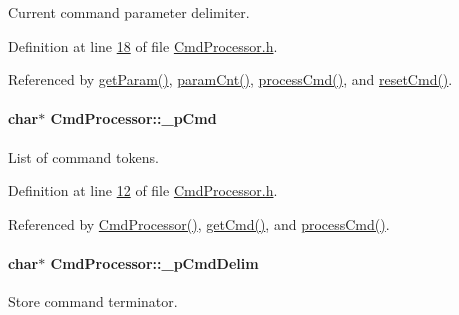 Current command parameter delimiter. 



Definition at line \hyperlink{_cmd_processor_8h_source_l00018}{18} of file \hyperlink{_cmd_processor_8h_source}{CmdProcessor.h}.



Referenced by \hyperlink{_cmd_processor_8cpp_source_l00146}{getParam()}, \hyperlink{_cmd_processor_8cpp_source_l00129}{paramCnt()}, \hyperlink{_cmd_processor_8cpp_source_l00092}{processCmd()}, and \hyperlink{_cmd_processor_8cpp_source_l00115}{resetCmd()}.

\hypertarget{class_cmd_processor_a2017c885b275984549385ba246ec37f5}{
\paragraph[{\_\-pCmd}]{\setlength{\rightskip}{0pt plus 5cm}char$\ast$ {\bf CmdProcessor::\_\-pCmd}}\hfill}
\label{class_cmd_processor_a2017c885b275984549385ba246ec37f5}


List of command tokens. 



Definition at line \hyperlink{_cmd_processor_8h_source_l00012}{12} of file \hyperlink{_cmd_processor_8h_source}{CmdProcessor.h}.



Referenced by \hyperlink{_cmd_processor_8cpp_source_l00011}{CmdProcessor()}, \hyperlink{_cmd_processor_8cpp_source_l00123}{getCmd()}, and \hyperlink{_cmd_processor_8cpp_source_l00092}{processCmd()}.

\hypertarget{class_cmd_processor_a0f926649b612897af1cbee71d6a1a90a}{
\paragraph[{\_\-pCmdDelim}]{\setlength{\rightskip}{0pt plus 5cm}char$\ast$ {\bf CmdProcessor::\_\-pCmdDelim}}\hfill}
\label{class_cmd_processor_a0f926649b612897af1cbee71d6a1a90a}


Store command terminator. 



